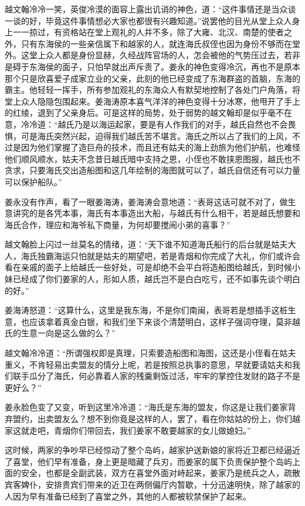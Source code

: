 越文翰冷冷一笑，英俊冷漠的面容上露出讥诮的神色，道：“这件事情还是当众谈一谈的好，毕竟这件事情想必大家也都很有兴趣知道。”说罢他的目光从堂上众人身上一一掠过，有资格站在堂上观礼的人并不多，除了大雍、北汉、南楚的使者之外，只有东海侯的一些亲信属下和越家的人，就连海氏叔侄也因为身份不够而在堂外。这堂上众人都是身份显赫，久经战阵官场的人，怎会被他的气势压过去，若非是碍于东海侯的面子，只怕早就出声斥责了。姜永的神色变得冷沉，再也不是原本那个只是欣喜爱子成家立业的父亲，此刻的他已经变成了东海群盗的首脑，东海的霸主。他轻轻一挥手，所有参加观礼的东海众人有默契地控制了各处门户角落，将堂上众人隐隐包围起来。姜海涛原本喜气洋洋的神色变得十分冰寒，他甩开了手上的红绫，退到了父亲身后。可是这样的局势，处于弱势的越文翰却是似乎毫不在意，冷冷道：“越氏乃是以海运起家，要是有人作我们的对手，越氏自然也不会畏惧，可是海氏突然兴起，迫得我们越氏苦不堪言。海氏之所以占了我们的上风，不过是因为他们掌握了造巨舟的技术，而且还有姑夫的海上劲旅为他们护航，也难怪他们顺风顺水，姑夫不念昔日越氏暗中支持之恩，小侄也不敢挟恩图报，越氏也不贪求，只要海氏交出造船图和这几年绘制的海图就可以了，越氏自信还有可以力量可以保护船队。”

姜永没有作声，看了一眼姜海涛，姜海涛会意地道：“表哥这话可就不对了，做生意讲究的是各凭本事，海氏有本事造出大船，与越氏有什么相干，若是越氏想要和海氏合作，理应和海爷私下商量，为何却要搅闹小弟的喜事？”

越文翰脸上闪过一丝莫名的情绪，道：“天下谁不知道海氏船行的后台就是姑夫大人，海氏独霸海运只怕就是姑夫的期望吧，若是青烟和你完成了大礼，你们或许会看在亲戚的面子上给越氏一些好处，可是却绝不会平白将造船图给越氏，到时候小妹已经成了你们姜家的人，形如人质，越氏岂不是白白吃亏，还不如事先谈个明白的好。”

姜海涛怒道：“这算什么，这里是我东海，不是你们南闽，表哥若是想插手这桩生意，也应该拿着真金白银，和我们坐下来谈个清楚明白，这样子强词夺理，莫非越氏的生意一向是这么做的么？”

越文翰冷冷道：“所谓强权即是真理，只索要造船图和海图，这还是小侄看在姑夫重义，不肯轻易出卖盟友的情分上呢，若是按照总执事的意思，早就要请姑夫和我们联手瓜分了海氏，何必靠着人家的残羹剩饭过活，牢牢的掌控住发财的路子不是更好么？”

姜永脸色变了又变，听到这里冷冷道：“海氏是东海的盟友，你这是让我们姜家背弃盟约，出卖盟友么？想不到你竟是这样的人，罢了，看在你姑姑的份上，你们越家这就走吧，青烟你们带回去，我们姜家不敢要越家的女儿做媳妇。”

这时候，两家的争吵早已经惊动了整个岛屿，越家护送新娘的家将近卫都已经逼近了喜堂，他们早有准备，身上更是暗藏了兵刃，而姜家的属下负责保护整个岛屿上面的安全，也都是全副武装，双方在喜堂外面对峙起来，姜家乃是统兵之人，疏散宾客婢仆，安排贵宾们带来的近卫在两侧偏厅内暂歇，十分迅速明快，除了越家的人因为早有准备已经到了喜堂之外，其他的人都被软禁保护了起来。

